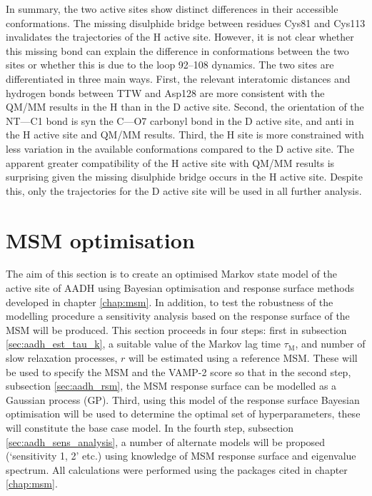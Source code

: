 In summary, the two active sites show distinct differences in their accessible conformations. The missing disulphide bridge between residues Cys81 and Cys113 invalidates the trajectories of the H active site. However, it is not clear whether this missing bond can explain the difference in conformations between the two sites or whether this is due to the loop \numrange[range-phrase=\text{--}]{92}{108} dynamics. The two sites are differentiated in three main ways. First, the relevant interatomic distances and hydrogen bonds between TTW and Asp128 are more consistent with the QM/MM results in the H than in the D active site. Second, the orientation of the NT---C1 bond is syn the C---O7 carbonyl bond in the D active site, and anti in the H active site and QM/MM results. Third, the H site is more constrained with less variation in the available conformations compared to the  D active site. The apparent greater compatibility of the H active site with QM/MM results is surprising given the missing disulphide bridge occurs in the H active site. Despite this, only the trajectories for the D active site will be used in all further analysis.  

\section{MSM optimisation}\label{sec:aadh_optimisation}

The aim of this section is to create an optimised Markov state model of the active site of AADH using Bayesian optimisation and response surface methods developed in chapter \ref{chap:msm}. In addition, to test the robustness of the modelling procedure a sensitivity analysis based on the response surface of the MSM will be produced. This section proceeds in four steps: first in subsection \ref{sec:aadh_est_tau_k}, a suitable  value of the Markov lag time $\tau_{\mathrm{M}}$, and number of slow relaxation processes, $r$ will be estimated using a reference MSM. These will be used to specify the MSM and the VAMP-2 score so that in the second step, subsection \ref{sec:aadh_rsm},  the MSM response surface can be modelled as a Gaussian process (GP). Third, using this model of the response surface Bayesian optimisation will be used to determine the optimal set of hyperparameters, these will constitute the base case model.  In the fourth step, subsection \ref{sec:aadh_sens_analysis}, a number of alternate models will be proposed (`sensitivity 1, 2' etc.)  using knowledge of MSM response surface and eigenvalue spectrum.  All calculations were performed using the packages cited in chapter \ref{chap:msm}. 

